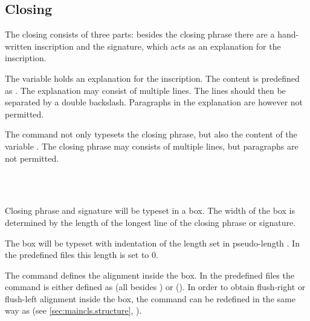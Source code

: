 \subsection{Closing}
\label{sec:scrlttr2.closing}

The closing consists of three parts: besides the closing phrase there
are a hand-written inscription and the signature, which acts as an
explanation for the inscription.

\begin{Declaration}
\end{Declaration}
%
The variable  holds an explanation for the
inscription. The content is predefined as
.  The explanation may consist
of multiple lines. The lines should then be separated by a double
backslash. Paragraphs in the explanation are however not permitted.
%
%

\begin{Declaration}
\end{Declaration}
%
The command  not only typesets the closing phrase, but
also the content of the variable .  The closing
phrase may consists of multiple lines, but paragraphs are not
permitted.
%
%

\begin{Declaration}
  \\
  \\
\end{Declaration}
%
%
%
Closing phrase and signature will be typeset in a box. The width of
the box is determined by the length of the longest line of the closing
phrase or signature.

The box will be typeset with indentation of the length set in
pseudo-length . In the predefined  files
this length is set to 0.

The command  defines the alignment inside the
box. In the predefined  files the command is either defined
as  (all besides ) or
 ().  In order to obtain
flush-right or flush-left alignment inside the box, the command can be
redefined in the same way as  (see
\autoref{sec:maincls.structure},
).

